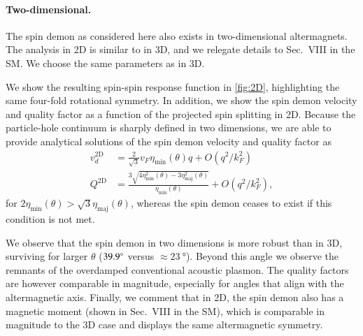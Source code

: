 \documentclass[aps,prl,reprint,twocolumns,superscriptaddress]{revtex4-2}
\newcommand{\kF}{k_{F}}
\newcommand{\vs}{v_d}
\begin{document}
	
	
	
	\paragraph{Two-dimensional. }The spin demon as considered here also exists in two-dimensional altermagnets. The analysis in 2D is similar to in 3D, and we relegate details to Sec.~VIII in the SM. We choose the same parameters as in 3D.
	
	We show the resulting spin-spin response function in \cref{fig:2D}, highlighting the same four-fold rotational symmetry. 
	 In addition, we show the spin demon velocity and quality factor as a function of the projected spin splitting in 2D. Because the particle-hole continuum is sharply defined in two dimensions,  we are able to provide analytical solutions of the spin demon velocity and quality factor as \cite{agarwalLonglivedSpinPlasmons2014}
	\begin{align}
		\vs^{\mathrm{2D}} &= \frac{2}{\sqrt{3}} v_F \eta_{\mathrm{min}}(\theta) q + O(q^2/\kF^2)\\
		Q^{\mathrm{2D}} &= \frac{3\sqrt{4\eta_{\mathrm{min}}^2(\theta)-3\eta_{\mathrm{maj}}^2(\theta)}}{\eta_{\mathrm{min}}(\theta)} + O(q^2/\kF^2),
	\end{align}
	for $2\eta_{\mathrm{min}}(\theta)>\sqrt{3}\eta_{\mathrm{maj}}(\theta)$, whereas the spin demon ceases to exist if this condition is not met. 
	
	
	We observe that the spin demon in two dimensions is more robust than in 3D, surviving for larger $\theta$ ($\SI{39.9}{\degree}$ versus $\approx\SI{23}{\degree}$). Beyond this angle we observe the remnants of the overdamped conventional acoustic plasmon. The quality factors are however comparable in magnitude, especially for angles that align with the altermagnetic axis. Finally, we comment that in 2D, the spin demon also has a magnetic moment (shown in Sec.~VIII in the SM), which is comparable in magnitude to the 3D case and displays the same altermagnetic symmetry.
	
\end{document}
